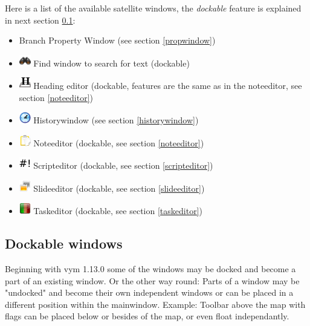 \documentclass[12pt,a4paper]{article}
\newcommand{\vym}{{\sc vym }}
\begin{document}
Here is a list of the available satellite windows, the {\em dockable}
feature is explained in next section \ref{dockable}:
\begin{itemize}
    \item Branch Property Window (see section \ref{propwindow})
    \item \includegraphics[width=0.5cm]{../icons/find.png}
        Find window to search for text (dockable)
    \item \includegraphics[width=0.5cm]{../icons/headingeditor.png}
        Heading editor (dockable, features are the same as in the
        noteeditor, see section \ref {noteeditor})
    \item \includegraphics[width=0.5cm]{../icons/history.png}
        Historywindow (see section \ref{historywindow})
    \item \includegraphics[width=0.5cm]{images/flags/system/note.png}
        Noteeditor (dockable, see section \ref {noteeditor})
    \item \includegraphics[width=0.5cm]{../icons/scripteditor.png}
        Scripteditor (dockable, see section \ref {scripteditor})
    \item \includegraphics[width=0.5cm]{../icons/slideeditor.png}
        Slideeditor (dockable, see section \ref {slideeditor})
    \item \includegraphics[width=0.5cm]{../icons/taskeditor.png}
        Taskeditor (dockable, see section \ref {taskeditor})
\end{itemize}

\subsection{Dockable windows} \label{dockable}
Beginning with \vym 1.13.0 some of the windows may be docked and become
a part of an existing window. Or the other way round: Parts of a window
may be "undocked" and become their own independent windows or can be
placed in a different position within the mainwindow. Example: Toolbar
above the map with flags can be placed below or besides of the map, or
even float independantly.
\end{document}
